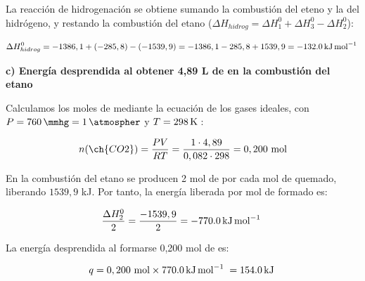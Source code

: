 \begin{exerciseEVAU}
\begin{solu}
        La reacción de hidrogenación se obtiene sumando la combustión del eteno y la del hidrógeno, y restando la combustión del etano (\(\Delta H_{hidrog} = \Delta H^0_1 + \Delta H^0_3 - \Delta H^0_2\)):

        \begin{equation*}
            \Delta H^0_{hidrog} = -1386,1 + (-285,8) - (-1539,9) = -1386,1 - 285,8 + 1539,9 = \energia[kjmol]{-132.0}
        \end{equation*}

        \textbf{c) Energía desprendida al obtener 4,89 L de  en la combustión del etano}

        Calculamos los moles de  mediante la ecuación de los gases ideales, con \(P = \SI{760}{\mmhg} = \SI{1}{\atmospher}\) y \(T = \temperatura[k]{298}\):

        \begin{equation*}
            n(\ch{CO2}) = \dfrac{PV}{RT} = \dfrac{1 \cdot 4,89}{0,082 \cdot 298} = 0,200 \ \text{mol}
        \end{equation*}

        En la combustión del etano se producen 2 mol de  por cada mol de  quemado, liberando \(1539,9\) kJ. Por tanto, la energía liberada por mol de  formado es:

        \begin{equation*}
            \dfrac{\Delta H^0_2}{2} = \dfrac{-1539,9}{2} = \energia[kjmol]{-770.0}
        \end{equation*}

        La energía desprendida al formarse 0,200 mol de  es:

        \begin{equation*}
            q = 0,200 \ \text{mol} \times \energia[kjmol]{770.0} = \energia[kj]{154.0}
        \end{equation*}

    \end{solu}
\end{exerciseEVAU}

